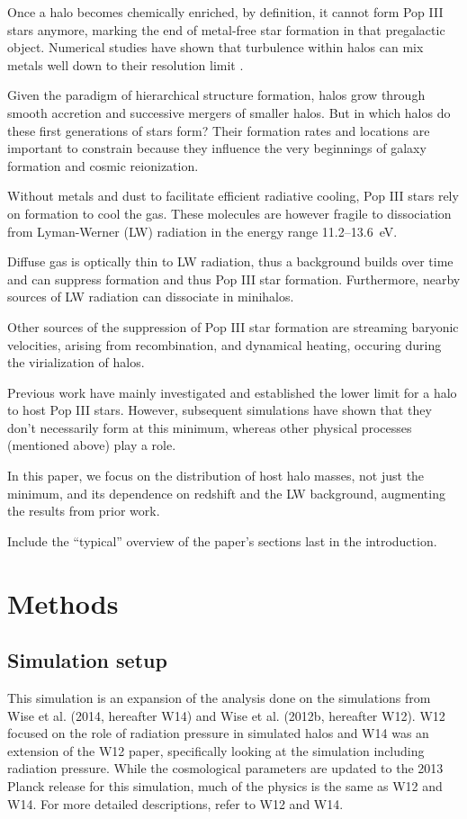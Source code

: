 \documentclass[a4paper,fleqn,usenatbib]{mnras}
\begin{document}
\li Once a halo becomes chemically enriched, by definition, it cannot
form Pop III stars anymore, marking the end of metal-free star
formation in that pregalactic object.  Numerical studies have shown
that turbulence within halos can mix metals well down to their
resolution limit \citep[][and more]{Wise08_Gal, Greif10}.

\li Given the paradigm of hierarchical structure formation, halos grow
through smooth accretion and successive mergers of smaller halos.  But
in which halos do these first generations of stars form?  Their
formation rates and locations are important to constrain because they
influence the very beginnings of galaxy formation and cosmic
reionization.

\li Without metals and dust to facilitate efficient radiative cooling,
Pop III stars rely on \hh{} formation to cool the gas.  These
molecules are however fragile to dissociation from Lyman-Werner
(LW) radiation in the energy range 11.2--13.6~eV.

\li Diffuse gas is optically thin to LW radiation, thus a background
builds over time and can suppress \hh{} formation and thus Pop III
star formation.  Furthermore, nearby sources of LW radiation can
dissociate \hh{} in minihalos.

\li Other sources of the suppression of Pop III star formation are
streaming baryonic velocities, arising from recombination, and
dynamical heating, occuring during the virialization of halos.

\li Previous work have mainly investigated and established the lower
limit for a halo to host Pop III stars.  However, subsequent
simulations have shown that they don't necessarily form at this
minimum, whereas other physical processes (mentioned above) play a
role.

\li In this paper, we focus on the distribution of host halo masses,
not just the minimum, and its dependence on redshift and the LW
background, augmenting the results from prior work.

\medskip
\noindent Include the ``typical'' overview of the paper's sections
last in the introduction.

\section{Methods}
\subsection{Simulation setup}
This simulation is an expansion of the analysis done on the 
simulations from Wise et al. (2014, hereafter W14) and Wise et al. 
(2012b, hereafter W12). W12 focused on the role of radiation pressure in simulated halos and W14 was an extension of the W12 paper, specifically looking at the simulation including radiation pressure. While the cosmological parameters are updated to the 2013 Planck release \citet{Planck13_Cosmo} for this simulation, much of the physics is the same as W12 and W14. For more detailed descriptions, refer to W12 and W14.
\end{document}
